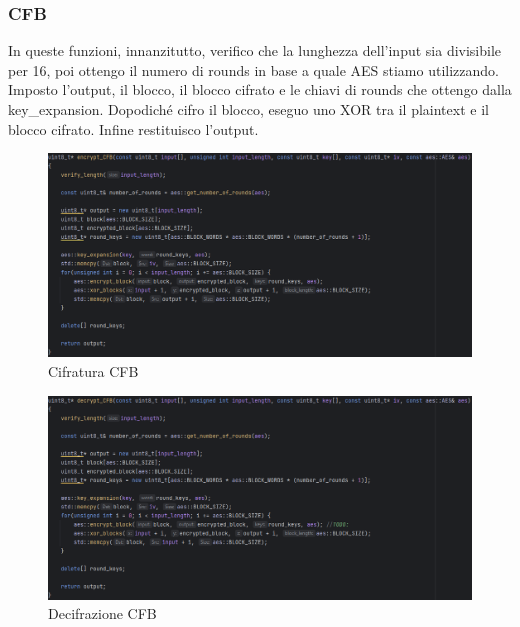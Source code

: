 \subsubsection{CFB}

\textsf{\small In queste funzioni, innanzitutto, verifico che la lunghezza dell'input sia divisibile per 16, poi ottengo il numero di rounds in base a quale AES stiamo utilizzando. Imposto l'output, il blocco, il blocco cifrato e le chiavi di rounds che ottengo dalla key\_expansion. Dopodiché cifro il blocco, eseguo uno XOR tra il plaintext e il blocco cifrato. Infine restituisco l'output.} %

\begin{figure}[H]
	\centering
	\includegraphics[width=1\textwidth, height=1\textheight, keepaspectratio]{./images/code/cpp/modes/encrypt_CFB.PNG}
	\caption{Cifratura CFB}
	\label{fig:encrypt_CFB}
\end{figure}

\textsf{\small }

\begin{figure}[H]
	\centering
	\includegraphics[width=1\textwidth, height=1\textheight, keepaspectratio]{./images/code/cpp/modes/decrypt_CFB.PNG}
	\caption{Decifrazione CFB}
	\label{fig:decrypt_CFB}
\end{figure}

